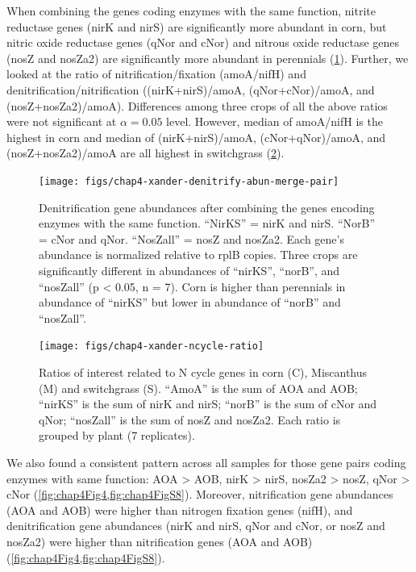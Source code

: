 \documentclass[]{msu-thesis}
\begin{document}
When combining the genes coding enzymes with the same function, nitrite reductase genes (nirK and nirS) are significantly more abundant in corn, but nitric oxide reductase genes (qNor and cNor) and nitrous oxide reductase genes (nosZ and nosZa2) are significantly more abundant in perennials (\cref{fig:chap4Fig5}). Further, we looked at the ratio of nitrification/fixation (amoA/nifH) and denitrification/nitrification ((nirK+nirS)/amoA, (qNor+cNor)/amoA, and (nosZ+nosZa2)/amoA). Differences among three crops of all the above ratios were not significant at $\alpha = 0.05$ level. However, median of amoA/nifH is the highest in corn and median of (nirK+nirS)/amoA, (cNor+qNor)/amoA, and (nosZ+nosZa2)/amoA are all highest in switchgrass (\cref{fig:chap4FigS8}).



\begin{figure}[tbph!]
  \centering
  \texttt{[image: figs/chap4-xander-denitrify-abun-merge-pair]}
  \caption[]{Denitrification gene abundances after combining the genes encoding enzymes with the same function. ``NirKS'' = nirK and nirS. ``NorB'' = cNor and qNor. ``NosZall'' = nosZ and nosZa2. Each gene’s abundance is normalized relative to rplB copies. Three crops are significantly different in abundances of “nirKS”, ``norB'', and ``nosZall'' (p < 0.05, n = 7). Corn is higher than perennials in abundance of ``nirKS'' but lower in abundance of ``norB'' and ``nosZall''.}
  \label{fig:chap4Fig5}
\end{figure}


\begin{figure}[tbph!]
  \centering
  \texttt{[image: figs/chap4-xander-ncycle-ratio]}
  \caption[Ratios of interest related to N cycle genes]{Ratios of interest related to N cycle genes in corn (C), Miscanthus (M) and switchgrass (S). ``AmoA'' is the sum of AOA and AOB; ``nirKS'' is the sum of nirK and nirS; ``norB'' is the sum of cNor and qNor; ``nosZall'' is the sum of nosZ and nosZa2. Each ratio is grouped by plant (7 replicates).}
  \label{fig:chap4FigS8}
\end{figure}



We also found a consistent pattern across all samples for those gene pairs coding enzymes with same function: AOA > AOB, nirK > nirS, nosZa2 > nosZ, qNor > cNor (\cref{fig:chap4Fig4,fig:chap4FigS8}). Moreover, nitrification gene abundances (AOA and AOB) were higher than nitrogen fixation genes (nifH), and denitrification gene abundances (nirK and nirS, qNor and cNor, or nosZ and nosZa2) were higher than nitrification genes (AOA and AOB) (\cref{fig:chap4Fig4,fig:chap4FigS8}).
\end{document}
